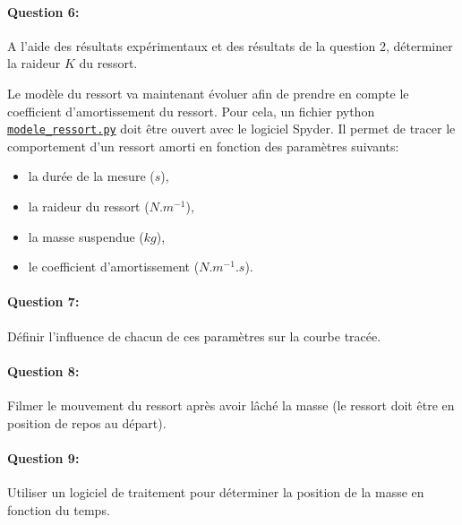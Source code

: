 
\paragraph{Question 6:} A l'aide des résultats expérimentaux et des résultats de la question 2, déterminer la raideur $K$ du ressort.


Le modèle du ressort va maintenant évoluer afin de prendre en compte le coefficient d'amortissement du ressort. Pour cela, un fichier python  
\href{https://github.com/Costadoat/Sciences-Ingenieur/raw/master/S01\%20Analyse\%20fonctionnelle/TP01\%20Mesures\%20physiques/Ilot_03\%20Ressort/modele_ressort.py}{\texttt{modele\_ressort.py}} doit être ouvert avec le logiciel Spyder. Il permet de tracer le comportement d'un ressort amorti en fonction des paramètres suivants:
\begin{itemize}
 \item la durée de la mesure ($s$),
 \item la raideur du ressort ($N.m^{-1}$),
 \item la masse suspendue ($kg$),
 \item le coefficient d'amortissement ($N.m^{-1}.s$).
\end{itemize}

\paragraph{Question 7:} Définir l'influence de chacun de ces paramètres sur la courbe tracée.


\paragraph{Question 8:} Filmer le mouvement du ressort après avoir lâché la masse (le ressort doit être en position de repos au départ).

\paragraph{Question 9:} Utiliser un logiciel de traitement pour déterminer la position de la masse en fonction du temps.


